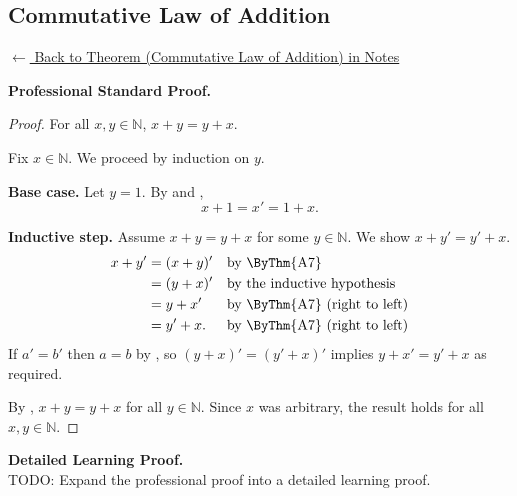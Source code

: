 
\subsection*{Commutative Law of Addition}
\label{prf:landau-plus-comm}

\begin{remark*}[Return]
\hyperref[thm:landau-plus-comm]{$\leftarrow$ Back to Theorem
(Commutative Law of Addition) in Notes}
\end{remark*}

\textbf{Professional Standard Proof.}~\\
\begin{proof}
\Claim For all $x, y \in \mathbb{N}$, $x + y = y + x$.

Fix $x \in \mathbb{N}$. We proceed by induction on $y$.

\textbf{Base case.} Let $y = 1$. By  and
,
\[
  x + 1 = x' = 1 + x.
\]

\textbf{Inductive step.} Assume $x + y = y + x$ for some $y \in \mathbb{N}$.
We show $x + y' = y' + x$.
\[
\begin{aligned}
  x + y'
    &= (x + y)'  && \text{by \ByThm{A7}} \\
    &= (y + x)'  && \text{by the inductive hypothesis} \\
    &= y + x'    && \text{by \ByThm{A7} (right to left)} \\
    &= y' + x.   && \text{by \ByThm{A7} (right to left)}
\end{aligned}
\]
If $a' = b'$ then $a = b$ by , so $(y + x)' = (y' + x)'$
implies $y + x' = y' + x$ as required.

By , $x + y = y + x$ for all $y \in \mathbb{N}$.
Since $x$ was arbitrary, the result holds for all $x, y \in \mathbb{N}$.
\end{proof}

\textbf{Detailed Learning Proof.}~\\
TODO: Expand the professional proof into a detailed learning proof.


